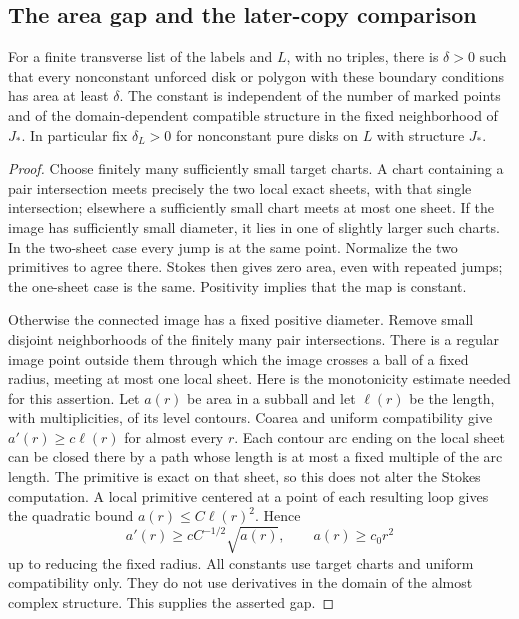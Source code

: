 \subsection{The area gap and the later-copy comparison}

\begin{lemma}\label{local:gap}
For a finite transverse list of the labels and $L$, with no triples, there
is $\delta>0$ such that every nonconstant unforced disk or polygon with
these boundary conditions has area at least $\delta$.  The constant is
independent of the number of marked points and of the domain-dependent
compatible structure in the fixed neighborhood of $J_*$.  In particular
fix $\delta_L>0$ for nonconstant pure disks on $L$ with structure $J_*$.
\end{lemma}
\begin{proof}
Choose finitely many sufficiently small target charts.  A chart containing
a pair intersection meets precisely the two local exact sheets, with that
single intersection; elsewhere a sufficiently small chart meets at most
one sheet.  If the image has sufficiently small diameter, it lies in one
of slightly larger such charts.  In the two-sheet case every jump is at
the same point.  Normalize the two primitives to agree there.  Stokes
then gives zero area, even with repeated jumps; the one-sheet case is the
same.  Positivity implies that the map is constant.

Otherwise the connected image has a fixed positive diameter.  Remove
small disjoint neighborhoods of the finitely many pair intersections.
There is a regular image point outside them through which the image
crosses a ball of a fixed radius, meeting at most one local sheet.  Here
is the monotonicity estimate needed for this assertion.  Let $a(r)$ be
area in a subball and let $\ell(r)$ be the length, with multiplicities, of
its level contours.  Coarea and uniform compatibility give
$a'(r)\geq c\ell(r)$ for almost every $r$.  Each contour arc ending on the
local sheet can be closed there by a path whose length is at most a fixed
multiple of the arc length.  The primitive is exact on that sheet, so
this does not alter the Stokes computation.  A local primitive centered
at a point of each resulting loop gives the quadratic bound
$a(r)\leq C\ell(r)^2$.  Hence
\[
 a'(r)\geq cC^{-1/2}\sqrt{a(r)},\qquad a(r)\geq c_0r^2
\]
up to reducing the fixed radius.  All constants use target charts and
uniform compatibility only.  They do not use derivatives in the domain
of the almost complex structure.  This supplies the asserted gap.
\end{proof}

